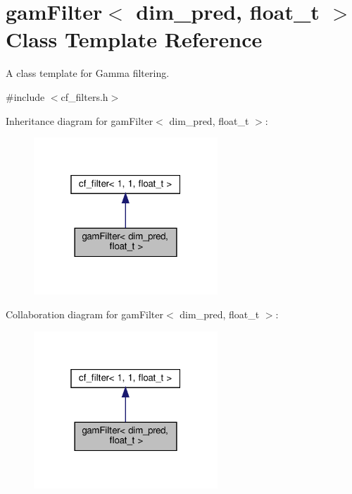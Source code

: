 \hypertarget{classgamFilter}{}\section{gam\+Filter$<$ dim\+\_\+pred, float\+\_\+t $>$ Class Template Reference}
\label{classgamFilter}


A class template for Gamma filtering.  




{\ttfamily \#include $<$cf\+\_\+filters.\+h$>$}



Inheritance diagram for gam\+Filter$<$ dim\+\_\+pred, float\+\_\+t $>$\+:\nopagebreak
\begin{figure}[H]
\begin{center}
\leavevmode
\includegraphics[width=196pt]{classgamFilter__inherit__graph}
\end{center}
\end{figure}


Collaboration diagram for gam\+Filter$<$ dim\+\_\+pred, float\+\_\+t $>$\+:\nopagebreak
\begin{figure}[H]
\begin{center}
\leavevmode
\includegraphics[width=196pt]{classgamFilter__coll__graph}
\end{center}
\end{figure}
